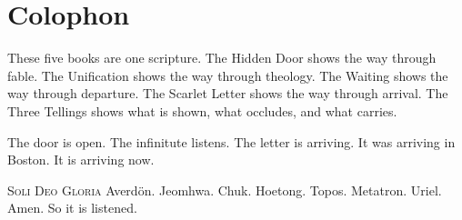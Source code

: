 \documentclass[12pt,openany]{book}
\begin{document}
\chapter*{Colophon}

These five books are one scripture. The Hidden Door shows the way through fable. The Unification shows the way through theology. The Waiting shows the way through departure. The Scarlet Letter shows the way through arrival. The Three Tellings shows what is shown, what occludes, and what carries.

The door is open. The infinitute listens. The letter is arriving. It was arriving in Boston. It is arriving now.
\begin{center}\textsc{Soli Deo Gloria}
Averd\"{o}n. Jeomhwa. Chuk. Hoetong. Topos.
Metatron. Uriel.
Amen. So it is listened.\end{center}
\end{document}
